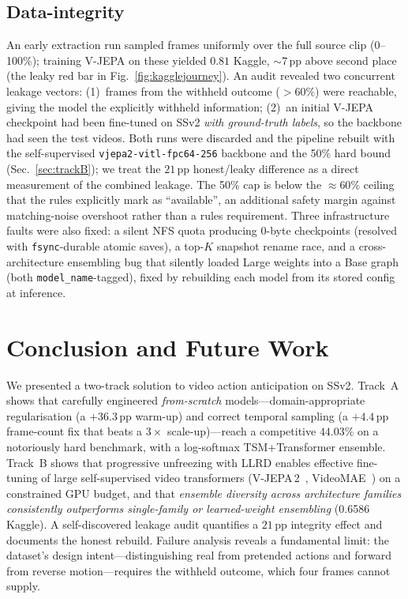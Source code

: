 \documentclass[10pt,twocolumn,letterpaper]{article}
\begin{document}
\subsection{Data-integrity}
\label{sec:integrity}
An early extraction run sampled frames uniformly over the full source clip
(0--100\%); training V-JEPA on these yielded $0.81$ Kaggle, ${\sim}7$\,pp above
second place (the leaky red bar in Fig.~\ref{fig:kagglejourney}). An audit revealed two concurrent leakage vectors: (1)~frames from
the withheld outcome ($>60\%$) were reachable, giving the model the explicitly
withheld information; (2)~an initial V-JEPA checkpoint had been fine-tuned on
SSv2 \emph{with ground-truth labels}, so the backbone had seen the test videos.
Both runs were discarded and the pipeline rebuilt with the self-supervised
\texttt{vjepa2-vitl-fpc64-256} backbone and the 50\% hard bound
(Sec.~\ref{sec:trackB}); we treat the $21$\,pp honest/leaky difference as a
direct measurement of the combined leakage. The 50\% cap is below the
$\approx 60\%$ ceiling that the rules explicitly mark as ``available'', an
additional safety margin against matching-noise overshoot rather than a
rules requirement. Three infrastructure faults were
also fixed: a silent NFS quota producing 0-byte checkpoints (resolved with
\texttt{fsync}-durable atomic saves), a top-$K$ snapshot rename race, and a
cross-architecture ensembling bug that silently loaded Large weights into a Base
graph (both \texttt{model\_name}-tagged), fixed by rebuilding each model from its
stored config at inference.

\section{Conclusion and Future Work}
\label{sec:conclusion}
We presented a two-track solution to video action anticipation on SSv2. Track~A
shows that carefully engineered \emph{from-scratch} models---domain-appropriate
regularisation (a $+36.3$\,pp warm-up) and correct temporal sampling (a
$+4.4$\,pp frame-count fix that beats a $3\times$ scale-up)---reach a competitive
$44.03\%$ on a notoriously hard benchmark, with a log-softmax TSM+Transformer
ensemble. Track~B shows that progressive unfreezing with LLRD enables effective
fine-tuning of large self-supervised video transformers
(V-JEPA\,2~\cite{bardes2025vjepa2}, VideoMAE~\cite{tong2022videomae}) on a
constrained GPU budget, and that \emph{ensemble diversity across architecture
families consistently outperforms single-family or learned-weight ensembling}
(0.6586 Kaggle). A self-discovered leakage audit quantifies a $21$\,pp integrity
effect and documents the honest rebuild. Failure analysis reveals a fundamental
limit: the dataset's design intent---distinguishing real from pretended actions
and forward from reverse motion---requires the withheld outcome, which four
frames cannot supply.
\end{document}
